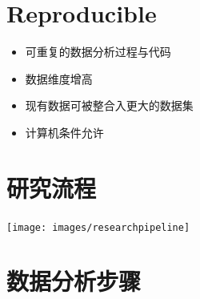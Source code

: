 \documentclass[
]{book}
\providecommand{\tightlist}{%
  \setlength{\itemsep}{0pt}\setlength{\parskip}{0pt}}
\begin{document}
\hypertarget{reproducible}{%
\section{Reproducible}\label{reproducible}}

\begin{itemize}
\tightlist
\item
  可重复的数据分析过程与代码
\item
  数据维度增高
\item
  现有数据可被整合入更大的数据集
\item
  计算机条件允许
\end{itemize}

\hypertarget{ux7814ux7a76ux6d41ux7a0b}{%
\section{研究流程}\label{ux7814ux7a76ux6d41ux7a0b}}

\texttt{[image: images/researchpipeline]}

\hypertarget{ux6570ux636eux5206ux6790ux6b65ux9aa4}{%
\section{数据分析步骤}\label{ux6570ux636eux5206ux6790ux6b65ux9aa4}}
\end{document}
